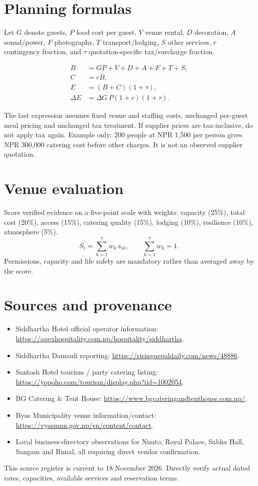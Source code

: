\section{Planning formulas}
Let $G$ denote guests, $P$ food cost per guest, $V$ venue rental, $D$ decoration, $A$ sound/power, $F$ photography, $T$ transport/lodging, $S$ other services, $r$ contingency fraction, and $\tau$ quotation-specific tax/surcharge fraction.

\begin{align}
B &= GP + V + D + A + F + T + S,\\
C &= rB,\\
E &= (B+C)(1+\tau),\\
\Delta E &= \Delta G\,P(1+r)(1+\tau).
\end{align}

The last expression assumes fixed venue and staffing costs, unchanged per-guest meal pricing and unchanged tax treatment. If supplier prices are tax-inclusive, do not apply tax again. Example only: 200 people at NPR 1,500 per person gives NPR 300,000 catering cost before other charges. It is not an observed supplier quotation.

\section{Venue evaluation}
Score verified evidence on a five-point scale with weights: capacity (25\%), total cost (20\%), access (15\%), catering quality (15\%), lodging (10\%), resilience (10\%), atmosphere (5\%).
\begin{equation}
S_i=\sum_{k=1}^{7} w_k\,s_{ik},
\qquad \sum_{k=1}^{7}w_k=1.
\end{equation}
Permissions, capacity and life safety are mandatory rather than averaged away by the score.

\section{Sources and provenance}
\begin{itemize}
\item Siddhartha Hotel official operator information: \url{https://apexhospitality.com.np/hospitality/siddhartha}.
\item Siddhartha Damauli reporting: \url{https://risingnepaldaily.com/news/48886}.
\item Santosh Hotel tourism / party catering listing: \url{https://yopoho.com/tourism/display.php?iid=1002054}.
\item BG Catering \& Tent House: \url{https://www.bgcateringandtenthouse.com.np/}.
\item Byas Municipality venue information/contact: \url{https://vyasmun.gov.np/en/content/contact}.
\item Local business-directory observations for Nimto, Royal Palace, Sabha Hall, Sangam and Rimal, all requiring direct vendor confirmation.
\end{itemize}
This source register is current to 18 November 2026. Directly verify actual dated rates, capacities, available services and reservation terms.

